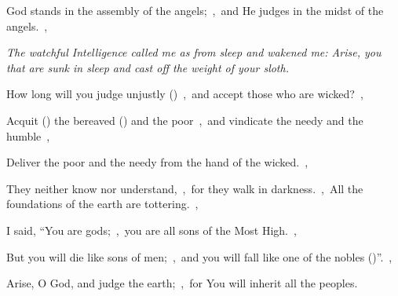 \documentclass[12pt,twoside,a5paper]{article}
\begin{document}





\begin{normalparskip}
  God stands in the assembly of the angels;~\sep\ and He judges in the midst of the angels.~\sep


   \emph{The watchful Intelligence called me as from sleep and wakened me: Arise, you that are sunk in sleep and cast off the weight of your sloth.}

  How long will you judge unjustly ()~\sep\ and accept those who are wicked?~\sep

  Acquit () the bereaved () and the poor~\sep\ and vindicate the needy and the humble~\sep

  Deliver the poor and the needy from the hand of the wicked.~\sep

  They neither know nor understand,~\sep\ for they walk in darkness.~\sep\ All the foundations of the earth are tottering.~\sep

  I said, ``You are gods;~\sep\ you are all sons of the Most High.~\sep

  But you will die like sons of men;~\sep\ and you will fall like one of the nobles ()''.~\sep

  Arise, O God, and judge the earth;~\sep\ for You will inherit all the peoples.
\end{normalparskip}

\end{document}
